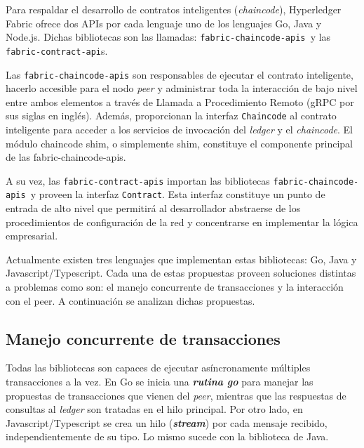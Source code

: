 Para respaldar el desarrollo de contratos inteligentes (\textit{chaincode}), Hyperledger Fabric ofrece dos APIs por cada lenguaje uno de los lenguajes Go, Java y Node.js. Dichas bibliotecas son las llamadas: \texttt{fabric-chaincode-apis }y las \texttt{fabric-contract-api}s.

Las \texttt{fabric-chaincode-apis} son responsables de ejecutar el contrato inteligente, hacerlo accesible para el nodo \textit{peer} y administrar toda la interacción de bajo nivel entre ambos elementos a través de Llamada a Procedimiento Remoto (gRPC por sus siglas en inglés). Además, proporcionan la interfaz  \texttt{Chaincode} al contrato inteligente para acceder a los servicios de invocación del \textit{ledger} y el \textit{chaincode}. El módulo chaincode shim, o simplemente shim, constituye el componente principal de las fabric-chaincode-apis.

A su vez, las \texttt{fabric-contract-apis} importan las bibliotecas \texttt{fabric-chaincode-apis }y  proveen la interfaz \texttt{Contract}. Esta interfaz constituye un punto de entrada de alto nivel que permitirá al desarrollador abstraerse de los procedimientos de configuración de la red y concentrarse en implementar la lógica empresarial.
%
%

Actualmente existen tres lenguajes que implementan estas bibliotecas: Go, Java y Javascript/Typescript. Cada una de estas propuestas proveen soluciones distintas a problemas como son: el manejo concurrente de transacciones y la interacción con el peer. A continuación se analizan dichas propuestas.

\subsection{Manejo concurrente de transacciones}
Todas las bibliotecas son capaces de ejecutar asíncronamente múltiples transacciones a la vez. En Go se inicia una \textit{\textbf{rutina go}} para manejar las propuestas de transacciones que vienen del \textit{peer}, mientras que las respuestas de consultas al \textit{ledger} son tratadas en el hilo principal. Por otro lado, en Javascript/Typescript se crea un hilo (\textit{\textbf{stream}}) por cada mensaje recibido, independientemente de su tipo. Lo mismo sucede con la biblioteca de Java.

